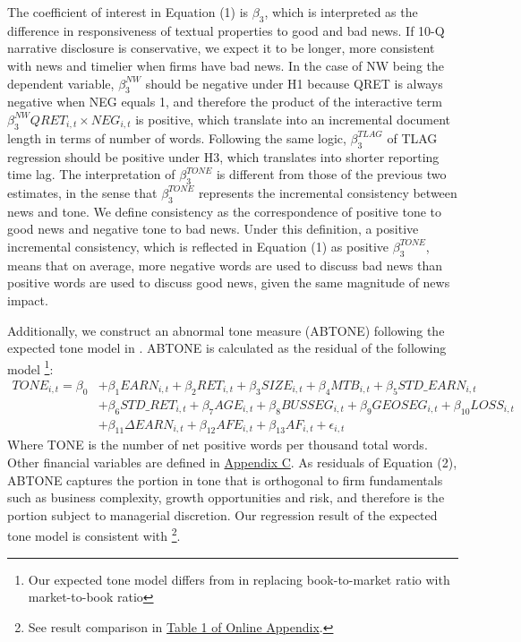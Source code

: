 \documentclass[a4paper]{article}
\begin{document}
\begin{spacing}{2}
The coefficient of interest in Equation (1) is $\beta_3$, which is interpreted as the difference in responsiveness of textual properties to good and bad news. If 10-Q narrative disclosure is conservative, we expect it to be longer, more consistent with news and timelier when firms have bad news. In the case of NW being the dependent variable, $\beta_3^{NW}$ should be negative under H1 because QRET is always negative when NEG equals 1, and therefore the product of the interactive term $\beta_3^{NW}QRET_{i,t}\times NEG_{i,t}$ is positive, which translate into an incremental document length in terms of number of words. Following the same logic, $\beta_3^{TLAG}$ of TLAG regression should be positive under H3, which translates into shorter reporting time lag. The interpretation of $\beta_3^{TONE}$ is different from those of the previous two estimates, in the sense that $\beta_3^{TONE}$ represents the incremental consistency between news and tone. We define consistency as the correspondence of positive tone to good news and negative tone to bad news. Under this definition, a positive incremental consistency, which is reflected in Equation (1) as positive $\beta_3^{TONE}$, means that on average, more negative words are used to discuss bad news than positive words are used to discuss good news, given the same magnitude of news impact.

Additionally, we construct an abnormal tone measure (ABTONE) following the expected tone model in \cite{huangToneManagement2014}. ABTONE is calculated as the residual of the following model \footnote{Our expected tone model differs from \cite{huangToneManagement2014} in replacing book-to-market ratio with market-to-book ratio}:
\begin{equation} \label{eq2}
\begin{split}
TONE_{i,t}=\beta_0&+\beta_1EARN_{i,t}+\beta_2RET_{i,t}+\beta_3SIZE_{i,t}+\beta_4MTB_{i,t}+\beta_5STD\_EARN_{i,t}\\
&+\beta_6STD\_RET_{i,t}+\beta_7AGE_{i,t}+\beta_8BUSSEG_{i,t}+\beta_9GEOSEG_{i,t}+\beta_{10}LOSS_{i,t}\\
&+\beta_{11}\Delta EARN_{i,t}+\beta_{12}AFE_{i,t}+\beta_{13}AF_{i,t}+\epsilon_{i,t}
\end{split}
\end{equation}
Where TONE is the number of net positive words per thousand total words. Other financial variables are defined in \hyperref[appc]{Appendix C}. As residuals of Equation (2), ABTONE captures the portion in tone that is orthogonal to firm fundamentals such as business complexity, growth opportunities and risk, and therefore is the portion subject to managerial discretion. Our regression result of the expected tone model is consistent with \cite{huangToneManagement2014} \footnote{See result comparison in \hyperref[oat1]{Table 1 of Online Appendix}.}.


\end{spacing}
\end{document}
